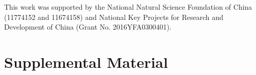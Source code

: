 \documentclass[amsmath,superscriptaddress,showpacs,aps,prl,twocolumn]{revtex4-1}
\begin{document}
\begin{acknowledgments}
\par This work was supported by the National Natural Science Foundation of China (11774152 and 11674158) and National Key Projects for Research and Development of China (Grant No. 2016YFA0300401).
\end{acknowledgments}



\widetext
\newpage
\appendix
\section{Supplemental Material}

\setcounter{equation}{0}
\setcounter{figure}{0}
\setcounter{table}{0}
\setcounter{section}{0}
\renewcommand{\theequation}{S\arabic{equation}}
\renewcommand{\thesection}{S\arabic{section}}
\renewcommand{\thetable}{S\arabic{table}}
\renewcommand{\thefigure}{S\arabic{figure}}
\end{document}
